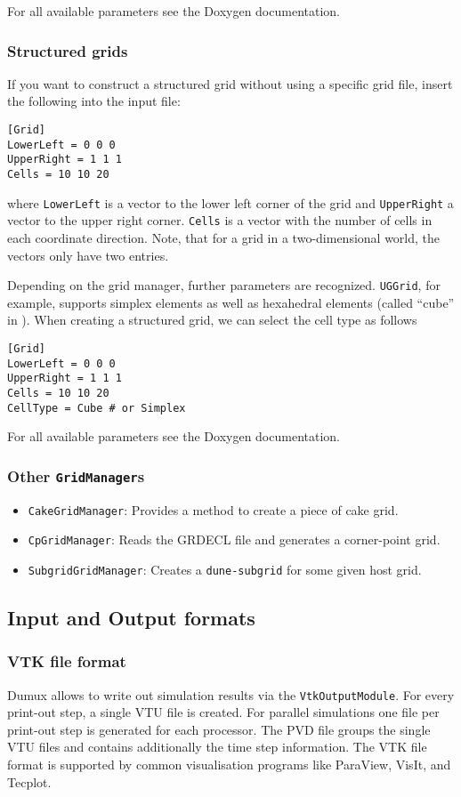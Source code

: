 For all available parameters see the Doxygen documentation.

\subsubsection{Structured grids}
If you want to construct a structured grid without using a specific grid file, insert the following into the input file:
\begin{lstlisting}[style=DumuxParameterFile]
[Grid]
LowerLeft = 0 0 0
UpperRight = 1 1 1
Cells = 10 10 20
\end{lstlisting}
where \texttt{LowerLeft} is a vector to the lower left corner of the grid and \texttt{UpperRight} a vector to the upper right corner.
\texttt{Cells} is a vector with the number of cells in each coordinate direction. Note,  that for a grid in a two-dimensional world, the
vectors only have two entries.

Depending on the grid manager, further parameters are recognized.
\texttt{UGGrid}, for example, supports simplex elements as well as hexahedral elements
(called ``cube'' in \Dune). When creating a structured grid, we can select the cell type as follows
\begin{lstlisting}[style=DumuxParameterFile]
[Grid]
LowerLeft = 0 0 0
UpperRight = 1 1 1
Cells = 10 10 20
CellType = Cube # or Simplex
\end{lstlisting}

For all available parameters see the Doxygen documentation.

\subsubsection{Other \Dumux \texttt{GridManager}s}
\begin{itemize}
\item \texttt{CakeGridManager}: Provides a method to create a piece of cake grid.
\item \texttt{CpGridManager}: Reads the GRDECL file and generates a corner-point grid.
\item \texttt{SubgridGridManager}: Creates a \texttt{dune-subgrid} for some given host grid.
\end{itemize}

\subsection{Input and Output formats}

\subsubsection{VTK file format}
Dumux allows to write out simulation results via the \texttt{VtkOutputModule}.
For every print-out step, a single VTU file is created. For parallel simulations one file
per print-out step is generated for each processor.
The PVD file groups the single VTU files and contains additionally the time step information.
The VTK file format is supported by common visualisation programs like ParaView, VisIt, and Tecplot.


